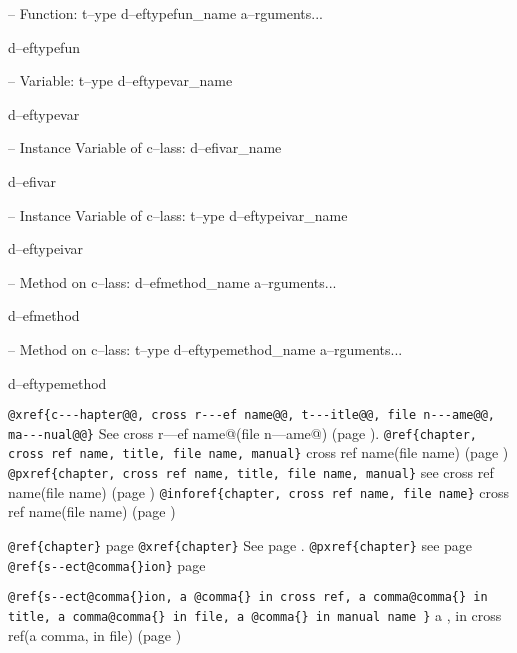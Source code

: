 \documentclass{book}
\begin{document}
\hbox{}-- Function: t--ype d--eftypefun\_name a--rguments...


d--eftypefun

\hbox{}-- Variable: t--ype d--eftypevar\_name


d--eftypevar

\hbox{}-- Instance Variable of c--lass: d--efivar\_name


d--efivar

\hbox{}-- Instance Variable of c--lass: t--ype d--eftypeivar\_name


d--eftypeivar

\hbox{}-- Method on c--lass: d--efmethod\_name a--rguments...


d--efmethod

\hbox{}-- Method on c--lass: t--ype d--eftypemethod\_name a--rguments...


d--eftypemethod

\texttt{@xref\{c{-}{-}{-}hapter@@, cross r{-}{-}{-}ef name@@, t{-}{-}{-}itle@@, file n{-}{-}{-}ame@@, ma{-}{-}{-}nual@@\}} See cross r---ef name@(file n---ame@) (page \pageref{anchor:c_002d_002d_002dhapter_0040}).
\texttt{@ref\{chapter, cross ref name, title, file name, manual\}} cross ref name(file name) (page \pageref{anchor:chapter})
\texttt{@pxref\{chapter, cross ref name, title, file name, manual\}} see cross ref name(file name) (page \pageref{anchor:chapter})
\texttt{@inforef\{chapter, cross ref name, file name\}} cross ref name(file name) (page \pageref{anchor:chapter})

\texttt{@ref\{chapter\}} page \pageref{anchor:chapter}
\texttt{@xref\{chapter\}} See page \pageref{anchor:chapter}.
\texttt{@pxref\{chapter\}} see page \pageref{anchor:chapter}
\texttt{@ref\{s{-}{-}ect@comma\{\}ion\}} page \pageref{anchor:s_002d_002dect_002cion}

\texttt{@ref\{s{-}{-}ect@comma\{\}ion, a @comma\{\} in cross
ref, a comma@comma\{\} in title, a comma@comma\{\} in file, a @comma\{\} in manual name \}}
a , in cross
ref(a comma, in file) (page \pageref{anchor:s_002d_002dect_002cion})
\end{document}
